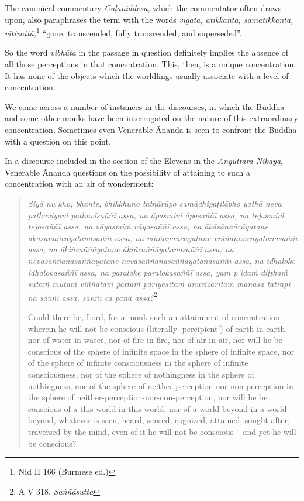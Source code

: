 The canonical commentary \emph{Cūḷaniddesa}, which the commentator often draws upon, also paraphrases the term with the words \emph{vigatā, atikkantā, samatikkantā, vītivattā,}\footnote{Nid II 166 (Burmese ed.)} ``gone, transcended, fully transcended, and superseded''.

So the word \emph{vibhūta} in the passage in question definitely implies the absence of all those perceptions in that concentration. This, then, is a unique concentration. It has none of the objects which the worldlings usually associate with a level of concentration.

We come across a number of instances in the discourses, in which the Buddha and some other monks have been interrogated on the nature of this extraordinary concentration. Sometimes even Venerable Ānanda is seen to confront the Buddha with a question on this point.

In a discourse included in the section of the Elevens in the \emph{Aṅguttara Nikāya}, Venerable Ānanda questions on the possibility of attaining to such a concentration with an air of wonderment:

\begin{quote}
\emph{Siyā nu kho, bhante, bhikkhuno tathārūpo samādhipaṭilābho yathā neva pathaviyaṁ pathavīsaññī assa, na āpasmiṁ āposaññī assa, na tejasmiṁ tejosaññī assa, na vāyasmiṁ vāyosaññī assa, na ākāsānañcāyatane ākāsānañcāyatanasaññī assa, na viññāṇañcāyatane viññāṇancāyatanasaññī assa, na ākiñcaññāyatane ākiñcaññāyatanasaññī assa, na nevasaññānāsaññāyatane nevasaññānāsaññāyatanasaññī assa, na idhaloke idhalokasaññī assa, na paraloke paralokasaññī assa, yam p'idaṁ diṭṭhaṁ sutaṁ mutaṁ viññātaṁ pattaṁ pariyesitaṁ anuvicaritaṁ manasā tatrāpi na saññī assa, saññī ca pana assa?}\footnote{A V 318, \emph{Saññāsutta}}

Could there be, Lord, for a monk such an attainment of concentration wherein he will not be conscious (literally `percipient') of earth in earth, nor of water in water, nor of fire in fire, nor of air in air, nor will he be conscious of the sphere of infinite space in the sphere of infinite space, nor of the sphere of infinite consciousness in the sphere of infinite consciousness, nor of the sphere of nothingness in the sphere of nothingness, nor of the sphere of neither-perception-nor-non-perception in the sphere of neither-perception-nor-non-perception, nor will he be conscious of a this world in this world, nor of a world beyond in a world beyond, whatever is seen, heard, sensed, cognized, attained, sought after, traversed by the mind, even of it he will not be conscious -- and yet he will be conscious?
\end{quote}

